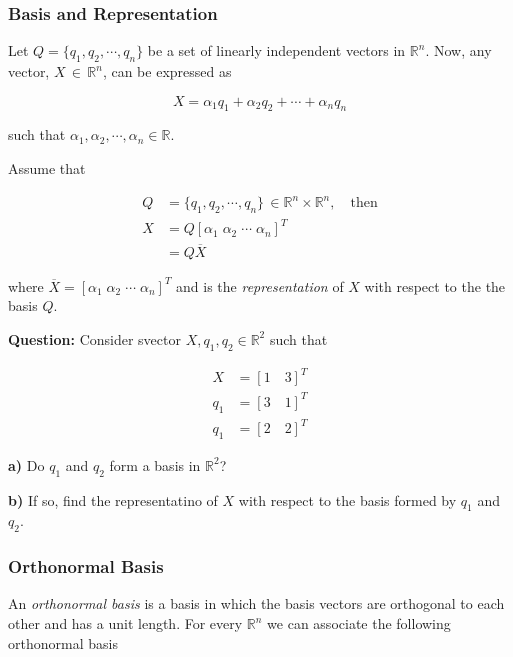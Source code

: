 \subsubsection{Basis and Representation}

Let $Q = \{q_1, q_2, \cdots, q_n \}$ be a set of linearly independent vectors in
$\mathbb{R}^n$. Now, any vector, $X \, \in \, \mathbb{R}^n$, can be expressed
as

\begin{equation} \label{eq:linear_combo_vector}
X = \alpha_1 q_1 + \alpha_2 q_2 + \cdots + \alpha_n q_n
\end{equation}

\noindent such that $\alpha_1, \alpha_2, \cdots, \alpha_n \in \mathbb{R}$.

Assume that

\begin{align}
  Q &= \{q_1, q_2, \cdots, q_n \} \, \in \mathbb{R}^n \times \mathbb{R}^n, \quad \text{then} \\
  X &= Q [\alpha_1 \; \alpha_2 \; \cdots \; \alpha_n]^T \\
    &= Q \overline{X}
\end{align}

\noindent where $\overline{X} = [\alpha_1 \; \alpha_2 \; \cdots \; \alpha_n]^T$
and is the \textit{representation} of $X$ with respect to the the basis $Q$.

\noindent \textbf{Question:} Consider svector $X, q_1, q_2 \in \mathbb{R}^2$
such that

\begin{align}
  X   &= [1 \quad 3]^T \\
  q_1 &= [3 \quad 1]^T \\
  q_1 &= [2 \quad 2]^T
\end{align}

\noindent \textbf{a)} Do $q_1$ and $q_2$ form a basis in $\mathbb{R}^2$?

\noindent \textbf{b)} If so, find the representatino of $X$ with respect to the
basis formed by $q_1$ and $q_2$.

\subsubsection{Orthonormal Basis}

An \textit{orthonormal basis} is a basis in which the basis vectors are
orthogonal to each other and has a unit length. For every $\mathbb{R}^n$ we can
associate the following orthonormal basis

\begin{equation}

\end{equation}
